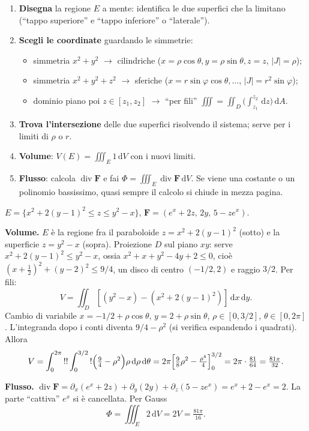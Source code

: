 \documentclass[11pt,a4paper,openany]{book}
\theoremstyle{plain}
\theoremstyle{definition}
\theoremstyle{remark}
\newcommand{\dd}{\,\mathrm{d}}
\newcommand{\Div}{\operatorname{div}}
\newcommand{\F}{\mathbf{F}}
\begin{document}
\begin{ricetta}[title={Volume + flusso}]
\begin{enumerate}
\item \textbf{Disegna} la regione $E$ a mente: identifica le due
   superfici che la limitano (``tappo superiore'' e ``tappo inferiore''
   o ``laterale'').
\item \textbf{Scegli le coordinate} guardando le simmetrie:
   \begin{itemize}
   \item simmetria $x^2+y^2$ $\to$ cilindriche
     ($x=\rho\cos\theta,y=\rho\sin\theta,z=z$, $|J|=\rho$);
   \item simmetria $x^2+y^2+z^2$ $\to$ sferiche
     ($x=r\sin\varphi\cos\theta,\dots$, $|J|=r^2\sin\varphi$);
   \item dominio piano poi $z\in[z_1,z_2]$ $\to$ ``per fili''
     $\iiint=\iint_D\big(\int_{z_1}^{z_2}\dd z\big)\dd A$.
   \end{itemize}
\item \textbf{Trova l'intersezione} delle due superfici risolvendo il
   sistema; serve per i limiti di $\rho$ o $r$.
\item \textbf{Volume}: $V(E)=\iiint_E 1\dd V$ con i nuovi limiti.
\item \textbf{Flusso}: calcola $\Div\F$ e fai
   $\Phi=\iiint_E \Div\F\dd V$. Se viene una costante o un polinomio
   bassissimo, quasi sempre il calcolo si chiude in mezza pagina.
\end{enumerate}
\end{ricetta}

\begin{esempio}[title={19/6/2024 --- Esercizio 1}]
$E=\{x^2+2(y-1)^2\le z\le y^2-x\}$, $\F=(e^x+2z,\,2y,\,5-ze^x)$.

\textbf{Volume.} $E$ \`e la regione fra il paraboloide
$z=x^2+2(y-1)^2$ (sotto) e la superficie $z=y^2-x$ (sopra).
Proiezione $D$ sul piano $xy$: serve $x^2+2(y-1)^2\le y^2-x$, ossia
$x^2+x+y^2-4y+2\le 0$, cio\`e
$(x+\tfrac12)^2+(y-2)^2\le 9/4$, un disco di centro $(-1/2,2)$
e raggio $3/2$. Per fili:
\[
V=\iint_D[(y^2-x)-(x^2+2(y-1)^2)]\dd x\dd y.
\]
Cambio di variabile $x=-1/2+\rho\cos\theta$, $y=2+\rho\sin\theta$,
$\rho\in[0,3/2]$, $\theta\in[0,2\pi]$. L'integranda dopo i conti
diventa $9/4-\rho^2$ (si verifica espandendo i quadrati). Allora
\[
V=\int_0^{2\pi}\\!\\!\int_0^{3/2}\\!\Big(\tfrac94-\rho^2\Big)\rho\dd\rho\dd\theta
=2\pi\Big[\tfrac{9}{8}\rho^2-\tfrac{\rho^4}{4}\Big]_0^{3/2}
=2\pi\cdot\tfrac{81}{64}=\tfrac{81\pi}{32}.
\]

\textbf{Flusso.}
$\Div\F=\partial_x(e^x+2z)+\partial_y(2y)+\partial_z(5-ze^x)
=e^x+2-e^x=2$. La parte ``cattiva'' $e^x$ si \`e cancellata.
Per Gauss
\[
\Phi=\iiint_E 2\dd V=2V=\tfrac{81\pi}{16}.
\]
\end{esempio}
\end{document}
